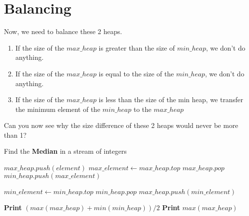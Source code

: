 \documentclass[12pt]{article}
\begin{document}
\section*{Balancing}
Now, we need to balance these 2 heaps. 

\begin{enumerate}
    \item If the size of the $max\_heap$ is greater than the size of $min\_heap$, we don't do anything.
    \item If the size of the $max\_heap$ is equal to the size of the $min\_heap$, we don't do anything.
    \item If the size of the $max\_heap$ is less than the size of the min heap, we transfer the minimum element of the $min\_heap$ to the $max\_heap$
\end{enumerate}

Can you now see why the size difference of these 2 heaps would never be more than 1?

\pagebreak

\begin{algorithm}

  \caption{Find the \textbf{Median} in a stream of integers}
  
  \begin{algorithmic}[1]
    \Statex
    
    
        \Statex
        
            \State $max\_heap.push(element)$ 
            \State $max\_element \gets max\_heap.top$
            \State $max\_heap.pop$
            \State $min\_heap.push(max\_element)$
            
            \Statex
            
             
                \State $min\_element \gets min\_heap.top$
                \State $min\_heap.pop$
                \State $max\_heap.push(min\_element)$
            \EndIf
            
            \Statex
            
             
                \State \textbf{Print} $( max(max\_heap) + min(min\_heap) ) /2$ 
            \Else
                \State \textbf{Print}  $max(max\_heap)$
            \EndIf
            
        \EndFor
    \EndFunction
  \end{algorithmic}
  
\end{algorithm}
\end{document}
